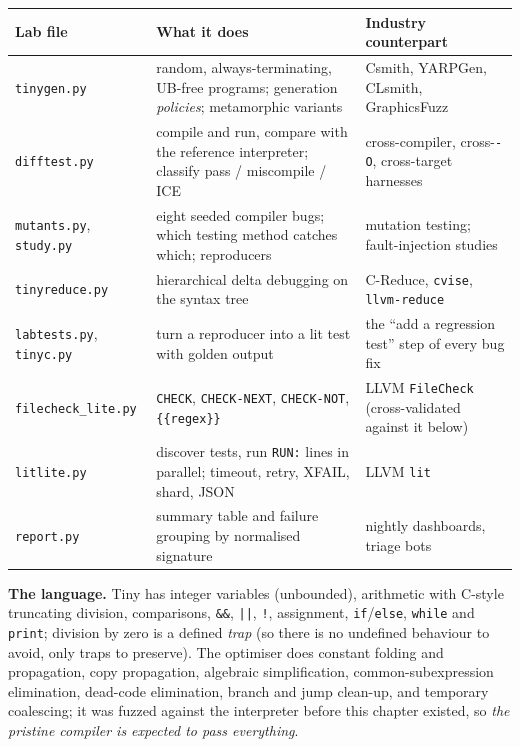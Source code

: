 \documentclass[10pt,a4paper,openany,oneside]{report}
\begin{document}
\begin{center}\small
\begin{xltabular}{\textwidth}{@{}L{3.6cm}L{4.3cm}Y@{}}
\toprule
\textbf{Lab file} & \textbf{What it does} & \textbf{Industry counterpart}\\
\midrule\endhead
\texttt{tinygen.py} & random, always-terminating, UB-free programs; generation \emph{policies}; metamorphic variants & Csmith, YARPGen, CLsmith, GraphicsFuzz\\
\texttt{difftest.py} & compile and run, compare with the reference interpreter; classify pass / miscompile / ICE & cross-compiler, cross-\texttt{-O}, cross-target harnesses\\
\texttt{mutants.py}, \texttt{study.py} & eight seeded compiler bugs; which testing method catches which; reproducers & mutation testing; fault-injection studies\\
\texttt{tinyreduce.py} & hierarchical delta debugging on the syntax tree & C-Reduce, \texttt{cvise}, \texttt{llvm-reduce}\\
\texttt{labtests.py}, \texttt{tinyc.py} & turn a reproducer into a lit test with golden output & the ``add a regression test'' step of every bug fix\\
\texttt{filecheck\_lite.py} & \texttt{CHECK}, \texttt{CHECK-NEXT}, \texttt{CHECK-NOT}, \texttt{\{\{regex\}\}} & LLVM \texttt{FileCheck} (cross-validated against it below)\\
\texttt{litlite.py} & discover tests, run \texttt{RUN:} lines in parallel; timeout, retry, XFAIL, shard, JSON & LLVM \texttt{lit}\\
\texttt{report.py} & summary table and failure grouping by normalised signature & nightly dashboards, triage bots\\
\bottomrule
\end{xltabular}
\end{center}
\textbf{The language.} Tiny has integer variables (unbounded), arithmetic with C-style truncating division, comparisons, \texttt{\&\&}, \texttt{||}, \texttt{!}, assignment, \texttt{if}/\texttt{else}, \texttt{while} and \texttt{print}; division by zero is a defined \emph{trap} (so there is no undefined behaviour to avoid, only traps to preserve). The optimiser does constant folding and propagation, copy propagation, algebraic simplification, common-subexpression elimination, dead-code elimination, branch and jump clean-up, and temporary coalescing; it was fuzzed against the interpreter before this chapter existed, so \emph{the pristine compiler is expected to pass everything}.
\end{document}
